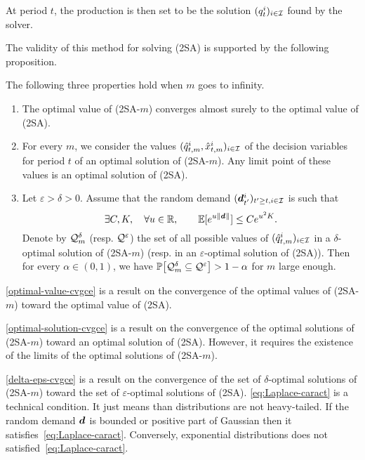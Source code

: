 At period $t$, the production is then set to be the solution $(q_t^i)_{i\in\mathcal{I}}$ found by the solver.


The validity of this method for solving (2SA) is supported by the following proposition.


\begin{prop}
\label{prop:cvgce-2SAm}
The following three properties hold when $m$ goes to infinity.
\begin{enumerate}[label=\textup{(\roman*)}]
\item \label{optimal-value-cvgce} The optimal value of \textup{(2SA-$m$)} converges almost surely to the optimal value of \textup{(2SA)}.


\item \label{optimal-solution-cvgce} For every $m$, we consider the values $(\hat{q}_{t,m}^i,\hat{x}_{t,m}^i)_{i\in\mathcal{I}}$ of the decision variables for period $t$ of an optimal solution of \textup{(2SA-$m$)}.
Any limit point of these values is an optimal solution of \textup{(2SA)}.


\item \label{delta-eps-cvgce} Let $\varepsilon> \delta > 0$.
Assume that the random demand $(\va\demand_{t'}^i)_{t'\geq t, i\in\REF}$ is such that
\begin{equation}
\exists C,K, \quad \forall u \in \RR, \qquad \EE[e^{u \|\va d\|}] \leq C e^{u^2 K} .
\label{eq:Laplace-caract}
\end{equation}
Denote by $\mathcal{Q}_m^{\delta}$ (resp. $\mathcal{Q}^{\varepsilon}$) the set of all possible values of $(\hat {q}_{t,m}^i)_{i\in\mathcal{I}}$ in a $\delta$-optimal solution of \textup{(2SA-$m$)} (resp. in an $\varepsilon$-optimal solution of \textup{(2SA)}).
Then for every $\alpha \in (0,1)$, we have $ \PP\sqbracket{\cQ_m^{\delta}\subseteq\cQ^{\varepsilon}} > 1 - \alpha$ for $m$ large enough.
\end{enumerate}
\end{prop}


\cref{optimal-value-cvgce} is a result on the convergence of the optimal values of (2SA-$m$) toward the optimal value of (2SA).


\cref{optimal-solution-cvgce} is a result on the convergence of the optimal solutions of (2SA-$m$) toward an optimal solution of (2SA).
However, it requires the existence of the limits of the optimal solutions of (2SA-$m$).


\cref{delta-eps-cvgce} is a result on the convergence of the set of $\delta$-optimal solutions of (2SA-$m$) toward the set of $\varepsilon$-optimal solutions of (2SA).
\cref{eq:Laplace-caract} is a technical condition.
It just means than distributions are not heavy-tailed.
If the random demand $\va\demand$ is bounded or positive part of Gaussian then it satisfies~\eqref{eq:Laplace-caract}.
Conversely, exponential distributions does not satisfied~\eqref{eq:Laplace-caract}.


